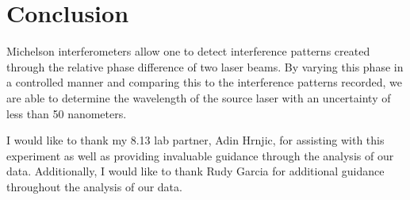     \section{Conclusion}
    Michelson interferometers allow one to detect interference patterns created through the relative phase difference of two laser beams. By varying this phase in a controlled manner and comparing this to the interference patterns recorded, we are able to determine the wavelength of the source laser with an uncertainty of less than 50 nanometers. 
    \begin{acknowledgements}
    I would like to thank my 8.13 lab partner, Adin Hrnjic, for assisting with this experiment as well as providing invaluable guidance through the analysis of our data. Additionally, I would like to thank Rudy Garcia for additional guidance throughout the analysis of our data.
  \end{acknowledgements}

  


